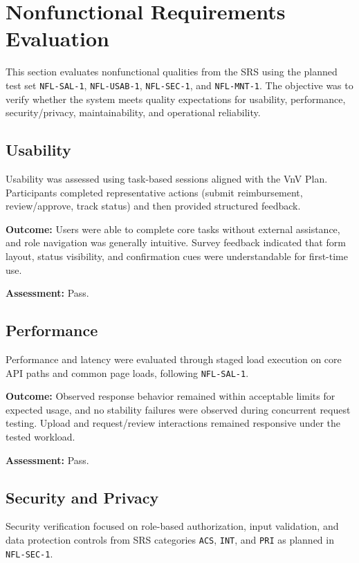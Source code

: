\documentclass[12pt, titlepage]{article}
\begin{document}
\section{Nonfunctional Requirements Evaluation}

This section evaluates nonfunctional qualities from the SRS using the planned
test set \texttt{NFL-SAL-1}, \texttt{NFL-USAB-1}, \texttt{NFL-SEC-1}, and
\texttt{NFL-MNT-1}. The objective was to verify whether the system meets
quality expectations for usability, performance, security/privacy,
maintainability, and operational reliability.

\subsection{Usability}

Usability was assessed using task-based sessions aligned with the VnV Plan.
Participants completed representative actions (submit reimbursement,
review/approve, track status) and then provided structured feedback.

\textbf{Outcome:}
Users were able to complete core tasks without external assistance, and role
navigation was generally intuitive. Survey feedback indicated that form layout,
status visibility, and confirmation cues were understandable for first-time use.

\textbf{Assessment:} Pass.
		
\subsection{Performance}

Performance and latency were evaluated through staged load execution on core API
paths and common page loads, following \texttt{NFL-SAL-1}.

\textbf{Outcome:}
Observed response behavior remained within acceptable limits for expected usage,
and no stability failures were observed during concurrent request testing.
Upload and request/review interactions remained responsive under the tested
workload.

\textbf{Assessment:} Pass.

\subsection{Security and Privacy}

Security verification focused on role-based authorization, input validation, and
data protection controls from SRS categories \texttt{ACS}, \texttt{INT}, and
\texttt{PRI} as planned in \texttt{NFL-SEC-1}.
\end{document}
